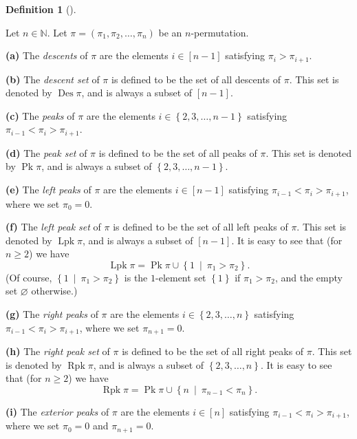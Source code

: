\documentclass[numbers=enddot,12pt,final,onecolumn,notitlepage]{scrartcl}%
\theoremstyle{definition}
\newtheorem{defi}[theo]{Definition}
\newenvironment{definition}[1][]
{\begin{defi}[#1]\begin{leftbar}}
{\end{leftbar}\end{defi}}
\begin{document}
\begin{definition}
\label{def.Des-et-al}Let $n\in\mathbb{N}$. Let $\pi=\left(  \pi_{1},\pi
_{2},\ldots,\pi_{n}\right)  $ be an $n$-permutation.

\textbf{(a)} The \textit{descents} of $\pi$ are the elements $i\in\left[
n-1\right]  $ satisfying $\pi_{i}>\pi_{i+1}$.

\textbf{(b)} The \textit{descent set} of $\pi$ is defined to be the set of all
descents of $\pi$. This set is denoted by $\operatorname*{Des}\pi$, and is
always a subset of $\left[  n-1\right]  $.

\textbf{(c)} The \textit{peaks} of $\pi$ are the elements $i\in\left\{
2,3,\ldots,n-1\right\}  $ satisfying $\pi_{i-1}<\pi_{i}>\pi_{i+1}$.

\textbf{(d)} The \textit{peak set} of $\pi$ is defined to be the set of all
peaks of $\pi$. This set is denoted by $\operatorname*{Pk}\pi$, and is always
a subset of $\left\{  2,3,\ldots,n-1\right\}  $.

\textbf{(e)} The \textit{left peaks} of $\pi$ are the elements $i\in\left[
n-1\right]  $ satisfying $\pi_{i-1}<\pi_{i}>\pi_{i+1}$, where we set $\pi
_{0}=0$.

\textbf{(f)} The \textit{left peak set} of $\pi$ is defined to be the set of
all left peaks of $\pi$. This set is denoted by $\operatorname*{Lpk}\pi$, and
is always a subset of $\left[  n-1\right]  $. It is easy to see that (for
$n\geq2$) we have%
\[
\operatorname*{Lpk}\pi=\operatorname*{Pk}\pi\cup\left\{  1\ \mid\ \pi_{1}%
>\pi_{2}\right\}  .
\]
(Of course, $\left\{  1\ \mid\ \pi_{1}>\pi_{2}\right\}  $ is the $1$-element
set $\left\{  1\right\}  $ if $\pi_{1}>\pi_{2}$, and the empty set
$\varnothing$ otherwise.)

\textbf{(g)} The \textit{right peaks} of $\pi$ are the elements $i\in\left\{
2,3,\ldots,n\right\}  $ satisfying $\pi_{i-1}<\pi_{i}>\pi_{i+1}$, where we set
$\pi_{n+1}=0$.

\textbf{(h)} The \textit{right peak set} of $\pi$ is defined to be the set of
all right peaks of $\pi$. This set is denoted by $\operatorname*{Rpk}\pi$, and
is always a subset of $\left\{  2,3,\ldots,n\right\}  $. It is easy to see
that (for $n\geq2$) we have%
\[
\operatorname*{Rpk}\pi=\operatorname*{Pk}\pi\cup\left\{  n\ \mid\ \pi
_{n-1}<\pi_{n}\right\}  .
\]


\textbf{(i)} The \textit{exterior peaks} of $\pi$ are the elements
$i\in\left[  n\right]  $ satisfying $\pi_{i-1}<\pi_{i}>\pi_{i+1}$, where we
set $\pi_{0}=0$ and $\pi_{n+1}=0$.


\end{definition}
\end{document}
